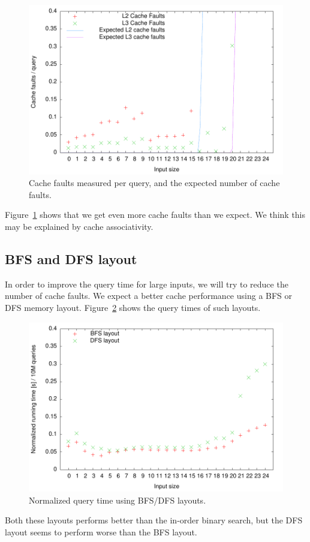 \begin{figure}[h!]
  \label{fig:bs_cachefaults}
  \centering
  \includegraphics[width=\textwidth]{../week1/plots/outputs/bs_cachefaults}
  \caption{Cache faults measured per query, and the expected number of cache faults.}
\end{figure}

Figure~\ref{fig:bs_cachefaults} shows that we get even more cache
faults than we expect. We think this may be explained by cache
associativity.

\subsection{BFS and DFS layout}
In order to improve the query time for large inputs, we will try to
reduce the number of cache faults. We expect a better cache
performance using a BFS or DFS memory
layout. Figure~\ref{fig:bfs_dfs_runningtime} shows the query times of
such layouts.

\begin{figure}[h!]
  \label{fig:bfs_dfs_runningtime}
  \centering
  \includegraphics[width=\textwidth]{../week1/plots/outputs/bfs_dfs_runningtime}
  \caption{Normalized query time using BFS/DFS layouts.}
\end{figure}

Both these layouts performs better than the in-order binary search,
but the DFS layout seems to perform worse than the BFS layout.
